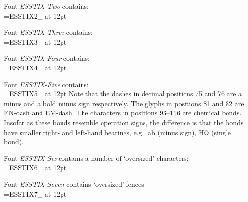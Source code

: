 \documentclass[11pt]{amsart}
\begin{document}
Font  \emph{ESSTIX-Two} contains:\\[3pt]\font\ess=ESSTIX2_ at 12pt
{\ess{}}\newline
{\ess{}}\newline
{\ess{}}{\ess{}}

Font  \emph{ESSTIX-Three} contains:\\[3pt]
\font\ess=ESSTIX3_ at 12pt
{\ess{}}\newline
{\ess{}}\newline
{\ess{}}

Font  \emph{ESSTIX-Four} contains:\\[3pt]
\font\ess=ESSTIX4_ at 12pt
{\ess{}}\newline
{\ess{}}\newline
{\ess{}}{\ess{}}

\newpage
Font  \emph{ESSTIX-Five} contains:\\[3pt]
\font\ess=ESSTIX5_ at 12pt
{\ess{}}\newline
{\ess{}}\newline
{\ess{}}\newline
{\ess{}}\newline
Note that the dashes in decimal positions 75 and 76 are a minus and a bold minus sign respectively. The glyphs in positions 81 and 82 are EN-dash and EM-dash. The characters in positions 93--116 are chemical bonds. Insofar as these bonds resemble operation signs, the difference is that the bonds have smaller right- and left-hand bearings, e.g., a{\ess{}}b (minus sign), H{\ess{}}O (single bond).

Font  \emph{ESSTIX-Six} contains  a number of `oversized' characters:\\[3pt]\font\ess=ESSTIX6_ at 12pt
{\ess{}}\newline
{\ess{}}

Font  \emph{ESSTIX-Seven} contains `oversized' fences:\\[3pt]\font\ess=ESSTIX7_ at 12pt
{\ess{}}\newline
{\ess{}}
\end{document}
